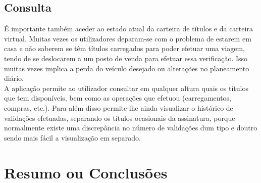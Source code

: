 \subsection{Consulta}

É importante também aceder ao estado atual da carteira de títulos e da carteira virtual. Muitas vezes os utilizadores deparam-se com o problema de estarem em casa e não saberem se têm títulos carregados para poder efetuar uma viagem, tendo de se deslocarem a um posto de venda para efetuar essa verificação. Isso muitas vezes implica a perda do veículo desejado ou alterações no planeamento diário.
\\A aplicação permite ao utilizador consultar em qualquer altura quais os títulos que tem disponíveis, bem como as operações que efetuou (carregamentos, compras, etc.). Para além disso permite-lhe ainda visualizar o histórico de validações efetuadas, separando os títulos ocasionais da assinatura, porque normalmente existe uma discrepância no número de validações dum tipo e doutro sendo mais fácil a visualização em separado.

%
%


\section{Resumo ou Conclusões}